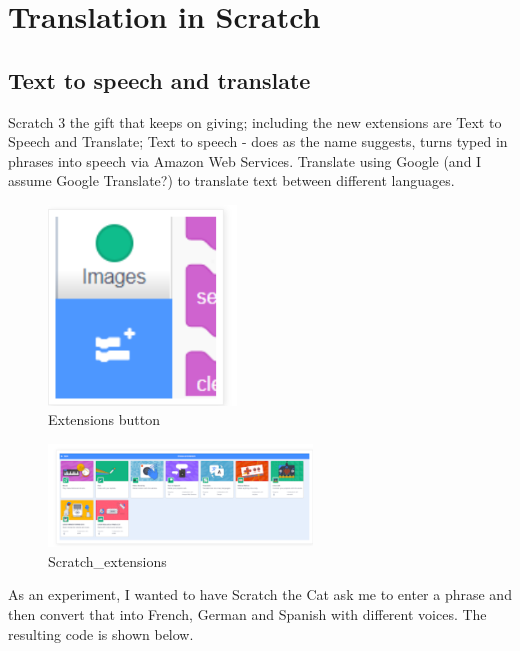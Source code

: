 \chapter{Translation in Scratch}

\section{Text to speech and translate}
Scratch 3 the gift that keeps on giving; including the new extensions are Text to Speech and Translate; Text to speech - does as the name suggests, turns typed in phrases into speech via Amazon Web Services. Translate using Google (and I assume Google Translate?) to translate text between different languages.

\begin{figure}
    \centering
    \includegraphics[width=5cm]{chapters/chapterCT1/figures/translat1.png}
    \caption{Extensions button}
    \label{fig:Scratch_extension_button}
\end{figure}

\begin{figure}
    \centering
    \includegraphics[width=7cm]{chapters/chapterCT1/figures/translate7.png}
    \caption{Scratch_extensions}
    \label{fig:mextensions_l}
\end{figure}


As an experiment, I wanted to  have Scratch the Cat ask me to enter a phrase and then convert that into French, German and Spanish with different voices. The resulting code is shown below.

